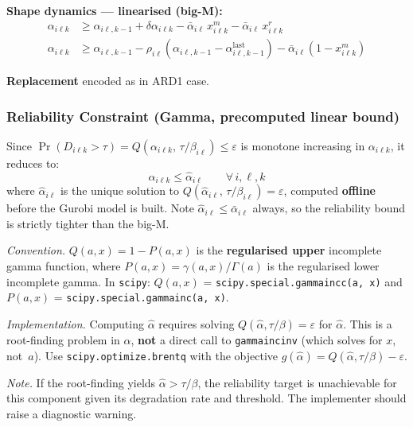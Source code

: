 \documentclass[11pt,a4paper]{article}
\begin{document}
\textbf{Shape dynamics --- linearised (big-M):}
\begin{align}
  \alpha_{i\ell k} &\geq \alpha_{i\ell,k-1} + \delta\alpha_{i\ell k}
    - \bar{\alpha}_{i\ell}\,x^m_{i\ell k}
    - \bar{\alpha}_{i\ell}\,x^r_{i\ell k} \\
  \alpha_{i\ell k} &\geq \alpha_{i\ell,k-1}
    - \rho_{i\ell}(\alpha_{i\ell,k-1} - \alpha^{\mathrm{last}}_{i\ell,k-1})
    - \bar{\alpha}_{i\ell}(1 - x^m_{i\ell k})
\end{align}

\textbf{Replacement} encoded as in ARD1 case.

\subsubsection{Reliability Constraint (Gamma, precomputed linear bound)}

Since $\Pr(D_{i\ell k} > \tau) = Q(\alpha_{i\ell k},\,\tau/\beta_{i\ell}) \leq \varepsilon$
is monotone increasing in $\alpha_{i\ell k}$, it reduces to:
\begin{equation}
  \alpha_{i\ell k} \leq \hat{\alpha}_{i\ell} \qquad \forall\, i,\ell,k
\end{equation}
where $\hat{\alpha}_{i\ell}$ is the unique solution to
$Q(\hat{\alpha}_{i\ell},\,\tau/\beta_{i\ell}) = \varepsilon$,
computed \textbf{offline} before the Gurobi model is built.
Note $\hat{\alpha}_{i\ell} \leq \bar{\alpha}_{i\ell}$ always, so the reliability
bound is strictly tighter than the big-M.

\emph{Convention.} $Q(a,x) = 1 - P(a,x)$ is the \textbf{regularised upper} incomplete
gamma function, where $P(a,x) = \gamma(a,x)/\Gamma(a)$ is the regularised lower
incomplete gamma. In \texttt{scipy}: $Q(a,x)$ = \texttt{scipy.special.gammaincc(a, x)}
and $P(a,x)$ = \texttt{scipy.special.gammainc(a, x)}.

\emph{Implementation.} Computing $\hat\alpha$ requires solving
$Q(\hat\alpha, \tau/\beta) = \varepsilon$ for $\hat\alpha$. This is a root-finding
problem in $\hat\alpha$, \textbf{not} a direct call to \texttt{gammaincinv} (which
solves for $x$, not~$a$). Use \texttt{scipy.optimize.brentq} with the objective
$g(\hat\alpha) = Q(\hat\alpha, \tau/\beta) - \varepsilon$.

\emph{Note.} If the root-finding yields $\hat\alpha > \tau/\beta$, the reliability
target is unachievable for this component given its degradation rate and threshold.
The implementer should raise a diagnostic warning.
\end{document}

